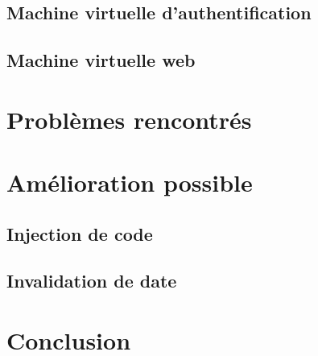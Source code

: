 \section{Machine virtuelle d'authentification}

\section{Machine virtuelle web}

\chapter{Problèmes rencontrés}

\chapter{Amélioration possible}

\section{Injection de code}

\section{Invalidation de date}

\chapter{Conclusion}
\label{chapter:bilan}

